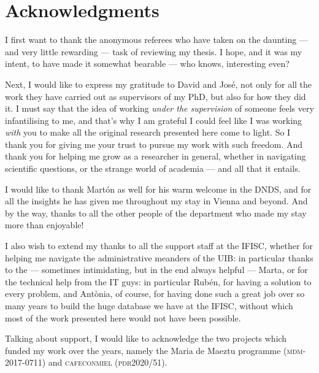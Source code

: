 \documentclass[../thesis.tex]{subfiles}
\begin{document}

\begingroup
\let\clearpage\relax
\let\cleardoublepage\relax
\let\cleardoublepage\relax
\chapter*{Acknowledgments}

I first want to thank the anonymous referees who have taken on the daunting --- and very little rewarding --- task of reviewing my thesis.
I hope, and it was my intent, to have made it somewhat bearable --- who knows, interesting even?

Next, I would like to express my gratitude to David and José, not only for all the work they have carried out as supervisors of my PhD, but also for how they did it.
I must say that the idea of working \emph{under the supervision} of someone feels very infantilising to me, and that's why I am grateful I could feel like I was working \emph{with} you to make all the original research presented here come to light.
So I thank you for giving me your trust to pursue my work with such freedom.
And thank you for helping me grow as a researcher in general, whether in navigating scientific questions, or the strange world of academia --- and all that it entails.

I would like to thank Martón as well for his warm welcome in the DNDS, and for all the insights he has given me throughout my stay in Vienna and beyond.
And by the way, thanks to all the other people of the department who made my stay more than enjoyable!

I also wish to extend my thanks to all the support staff at the IFISC, whether for helping me navigate the administrative meanders of the UIB: in particular thanks to the --- sometimes intimidating, but in the end always helpful --- Marta, or for the technical help from the IT guys: in particular Rubén, for having a solution to every problem, and Antònia, of course, for having done such a great job over so many years to build the huge database we have at the IFISC, without which most of the work presented here would not have been possible.

Talking about support, I would like to acknowledge the two projects which funded my work over the years, namely the Maria de Maeztu programme (\textsc{mdm}-2017-0711) and \textsc{cafeconmiel} (\textsc{pdr}2020/51).
\\
\end{document}
